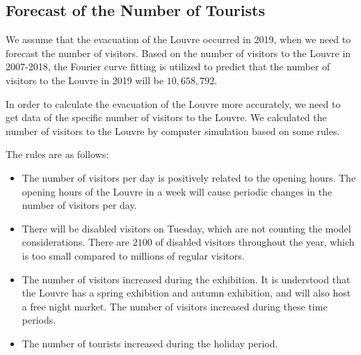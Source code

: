 \subsection{Forecast of the Number of Tourists}

We assume that the evacuation of the Louvre occurred in 2019, when we need to forecast the number of visitors. Based on the number of visitors to the Louvre in 2007-2018, the Fourier curve fitting is utilized to predict that the number of visitors to the Louvre in 2019 will be \textbf{$10,658,792$}.


In order to calculate the evacuation of the Louvre more accurately, we need to get data of the specific number of visitors to the Louvre. We calculated the number of visitors to the Louvre by computer simulation based on some rules.




The rules are as follows:
\begin{itemize}
    \item The number of visitors per day is positively related to the opening hours. The opening hours of the Louvre in a week will cause periodic changes in the number of visitors per day.
    \item There will be disabled visitors on Tuesday, which are not counting the model considerations. There are $2100$ of disabled visitors throughout the year, which is too small compared to millions of regular visitors.
    \item The number of visitors increased during the exhibition. It is understood that the Louvre has a spring exhibition and autumn exhibition, and will also host a free night market. The number of visitors increased during these time periods.
    \item The number of tourists increased during the holiday period.
\end{itemize}

